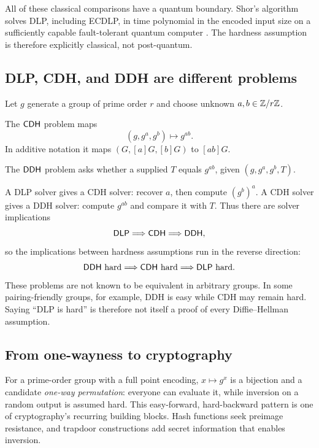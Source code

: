 All of these classical comparisons have a quantum boundary. Shor's algorithm
solves DLP, including ECDLP, in time polynomial in the encoded input size on a
sufficiently capable fault-tolerant quantum computer \cite{shor1997}. The
hardness assumption is therefore explicitly classical, not post-quantum.

\subsection{DLP, CDH, and DDH are different problems}

Let $g$ generate a group of prime order $r$ and choose unknown
$a,b\in\mathbb{Z}/r\mathbb{Z}$.

\begin{definition}
The $\mathsf{CDH}$ problem maps
\[
  (g,g^a,g^b)\longmapsto g^{ab}.
\]
In additive notation it maps $(G,[a]G,[b]G)$ to $[ab]G$.
\end{definition}

\begin{definition}
The $\mathsf{DDH}$ problem asks whether a supplied $T$ equals $g^{ab}$, given
$(g,g^a,g^b,T)$.
\end{definition}

A DLP solver gives a CDH solver: recover $a$, then compute $(g^b)^a$.
A CDH solver gives a DDH solver: compute $g^{ab}$ and compare it with $T$.
Thus there are solver implications
\[
  \mathsf{DLP}\Longrightarrow\mathsf{CDH}\Longrightarrow\mathsf{DDH},
\]
so the implications between hardness assumptions run in the reverse direction:
\[
  \text{$\mathsf{DDH}$ hard}\Longrightarrow\text{$\mathsf{CDH}$ hard}
  \Longrightarrow\text{$\mathsf{DLP}$ hard}.
\]
These problems are not known to be equivalent in arbitrary groups. In
some pairing-friendly groups, for example, DDH is easy while CDH may remain
hard. Saying ``DLP is hard'' is therefore not itself a proof of every
Diffie--Hellman assumption.

\subsection{From one-wayness to cryptography}

For a prime-order group with a full point encoding, $x\mapsto g^x$ is a
bijection and a candidate \emph{one-way permutation}: everyone can evaluate
it, while inversion on a random output is assumed hard. This easy-forward,
hard-backward pattern is one of cryptography's recurring building blocks. Hash
functions seek preimage resistance, and trapdoor constructions add secret
information that enables inversion.

